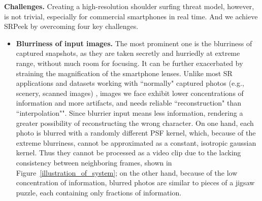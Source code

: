 \vspace{1mm}
\noindent
\textbf{Challenges.} Creating a high-resolution shoulder surfing threat model, however, is not trivial, especially for commercial smartphones in real time. And we achieve \textsf{SRPeek} by overcoming four key challenges.


\begin{itemize}[leftmargin=*]
  \item \textbf{Blurriness of input images.} The most prominent one is the blurriness of captured snapshots, as they are taken secretly and hurriedly at extreme range, without much room for focusing. It can be further exacerbated by straining the magnification of the smartphone lenses. Unlike most SR applications and datasets working with ``normally" captured photos (e.g., scenery, scanned images) \cite{nasrollahi2020deep,lyn2020image}, images we face exhibit lower concentrations of information and more artifacts, and needs reliable ``reconstruction" than ``interpolation"". Since blurrier input means less information, rendering a greater possibility of reconstructing the wrong character. 
  On one hand, each photo is blurred with a randomly different PSF kernel, which, because of the extreme blurriness, cannot be approximated as a constant, isotropic gaussian kernel. Thus they cannot be processed as a video clip due to the lacking consistency between neighboring frames, shown in Figure~\ref{illustration_of_system}; on the other hand, because of the low concentration of information, blurred photos are similar to pieces of a jigsaw puzzle, each containing only fractions of information.

\end{itemize}
